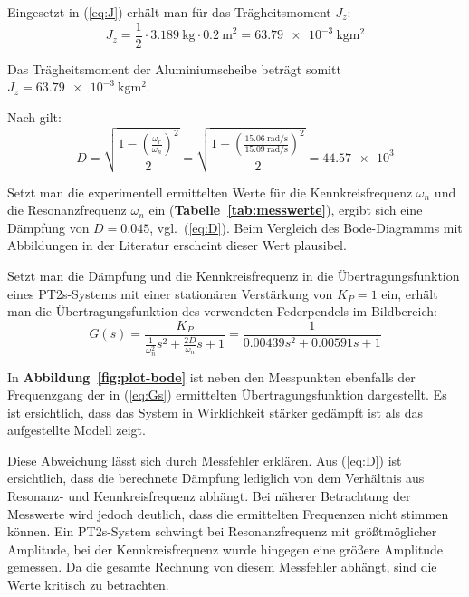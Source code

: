 \documentclass[a4paper,12pt]{scrartcl}
\begin{document}
Eingesetzt in (\ref{eq:J}) erhält man für das Trägheitsmoment $J_{z}$:
\begin{equation}
	J_z = \frac{1}{2} \cdot \SI{3.189}{\kilogram} \cdot {\SI{0.2}{\metre}}^2 = \SI{63.79e-3}{\kilogram\square\metre}
\end{equation}

Das Trägheitsmoment der Aluminiumscheibe beträgt somitt $J_{z} = \SI{63.79e-3}{\kilogram\square\metre}$.

Nach \cite{skript} gilt:
\begin{equation}
	\label{eq:D}
	D = \sqrt{ \frac{1 - \left( \frac{\omega_{r}}{\omega_{n}} \right)^{2}}{2} }
		= \sqrt{ \frac{1 - \left( \frac{\SI{15.06}{\radian\per\second}}{\SI{15.09}{\radian\per\second}} \right)^{2}}{2} }
		= \num{44.57e3}
\end{equation}

Setzt man die experimentell ermittelten Werte für die Kennkreisfrequenz $\omega_{n}$ und die Resonanzfrequenz $\omega_{n}$ ein (\textbf{Tabelle~\ref{tab:messwerte}}), ergibt sich eine Dämpfung von $D = 0.045$, vgl.~(\ref{eq:D}). Beim Vergleich des Bode-Diagramms mit Abbildungen in der Literatur erscheint dieser Wert plausibel.

Setzt man die Dämpfung und die Kennkreisfrequenz in die Übertragungsfunktion eines PT2s-Systems mit einer stationären Verstärkung von $K_{P} = 1$ ein, erhält man die Übertragungsfunktion des verwendeten Federpendels im Bildbereich:
\begin{equation}
	\label{eq:Gs}
	G \left( s \right) = \frac{K_{P}}{\frac{1}{\omega_{n}^{2}} s^{2} + \frac{2 D}{\omega_{n}} s + 1} = \frac{1}{0.00439 s^{2} + 0.00591 s + 1}
\end{equation}

In \textbf{Abbildung~\ref{fig:plot-bode}} ist neben den Messpunkten ebenfalls der Frequenzgang der in (\ref{eq:Gs}) ermittelten Übertragungsfunktion dargestellt.
Es ist ersichtlich, dass das System in Wirklichkeit stärker gedämpft ist als das aufgestellte Modell zeigt.

Diese Abweichung lässt sich durch Messfehler erklären.
Aus (\ref{eq:D}) ist ersichtlich, dass die berechnete Dämpfung lediglich von dem Verhältnis aus Resonanz- und Kennkreisfrequenz abhängt.
Bei näherer Betrachtung der Messwerte wird jedoch deutlich, dass die ermittelten Frequenzen nicht stimmen können.
Ein PT2s-System schwingt bei Resonanzfrequenz mit größtmöglicher Amplitude, bei der Kennkreisfrequenz wurde hingegen eine größere Amplitude gemessen.
Da die gesamte Rechnung von diesem Messfehler abhängt, sind die Werte kritisch zu betrachten.
\end{document}
